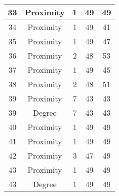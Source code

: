 \documentclass[results.tex]{subfiles}
\begin{document}
\begin{center}
\begin{tabular}{| c || c | c | c | c |}
            \hline
            33                      & Proximity                    & 1                      & 49                      & 49                   \\
            \hline
            34                      & Proximity                    & 1                      & 49                      & 41                   \\
            \hline
            35                      & Proximity                    & 1                      & 49                      & 47                   \\
            \hline
            36                      & Proximity                    & 2                      & 48                      & 53                   \\
            \hline
            37                      & Proximity                    & 1                      & 49                      & 45                   \\
            \hline
            38                      & Proximity                    & 2                      & 48                      & 51                   \\
            \hline
            39                      & Proximity                    & 7                      & 43                      & 43                   \\
            \hline
            39                      & Degree                       & 7                      & 43                      & 43                   \\
            \hline
            40                      & Proximity                    & 1                      & 49                      & 49                   \\
            \hline
            41                      & Proximity                    & 1                      & 49                      & 49                   \\
            \hline
            42                      & Proximity                    & 3                      & 47                      & 49                   \\
            \hline
            43                      & Proximity                    & 1                      & 49                      & 49                   \\
            \hline
            43                      & Degree                       & 1                      & 49                      & 49                   \\

\end{tabular}
\end{center}
\end{document}
